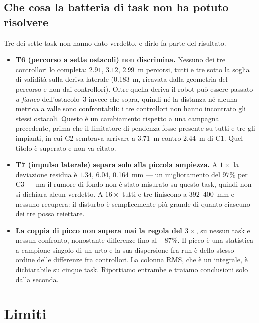 \documentclass[11pt,a4paper]{article}
\newcommand{\Co}{\textsf{C1}}
\newcommand{\Ct}{\textsf{C2}}
\newcommand{\Cth}{\textsf{C3}}
\begin{document}
\subsection{Che cosa la batteria di task non ha potuto risolvere}

Tre dei sette task non hanno dato verdetto, e dirlo fa parte del risultato.

\begin{itemize}
\item \textbf{T6 (percorso a sette ostacoli) non discrimina.} Nessuno dei tre
controllori lo completa: $2.91$, $3.12$, \SI{2.99}{\meter} percorsi, tutti e
tre sotto la soglia di validit\`a sulla deriva laterale (\SI{0.183}{\meter},
ricavata dalla geometria del percorso e non dai controllori). Oltre quella
deriva il robot pu\`o essere passato \emph{a fianco} dell'ostacolo~3 invece che
sopra, quindi n\'e la distanza n\'e alcuna metrica a valle sono confrontabili: i
tre controllori non hanno incontrato gli stessi ostacoli. Questo \`e un
cambiamento rispetto a una campagna precedente, prima che il limitatore di
pendenza fosse presente su tutti e tre gli impianti, in cui \Ct{} sembrava
arrivare a \SI{3.71}{\meter} contro \SI{2.44}{\meter} di \Co. Quel titolo \`e
superato e non va citato.

\item \textbf{T7 (impulso laterale) separa solo alla piccola ampiezza.} A
$1\times$ la deviazione residua \`e $1.34$, $6.04$, \SI{0.164}{\milli\meter} ---
un miglioramento del $97\%$ per \Cth{} --- ma il rumore di fondo non \`e stato
misurato su questo task, quindi non si dichiara alcun verdetto. A $16\times$
tutti e tre finiscono a $392$--\SI{400}{\milli\meter} e nessuno recupera: il
disturbo \`e semplicemente pi\`u grande di quanto ciascuno dei tre possa
reiettare.

\item \textbf{La coppia di picco non supera mai la regola del $3\times$}, su
nessun task e nessun confronto, nonostante differenze fino al $+87\%$. Il picco
\`e una statistica a campione singolo di un urto e la sua dispersione fra run \`e
dello stesso ordine delle differenze fra controllori. La colonna RMS, che \`e un
integrale, \`e dichiarabile su cinque task. Riportiamo entrambe e traiamo
conclusioni solo dalla seconda.
\end{itemize}

\section{Limiti}
\label{sec:limits}
\end{document}
